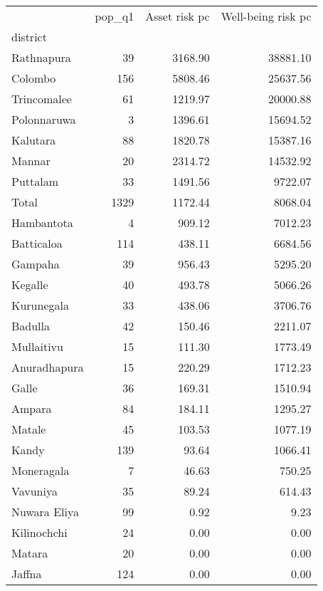 \begin{tabular}{lrrr}
\toprule
{} &  pop\_q1 &  Asset risk pc &  Well-being risk pc \\
district     &         &                &                     \\
\midrule
Rathnapura   &      39 &        3168.90 &            38881.10 \\
Colombo      &     156 &        5808.46 &            25637.56 \\
Trincomalee  &      61 &        1219.97 &            20000.88 \\
Polonnaruwa  &       3 &        1396.61 &            15694.52 \\
Kalutara     &      88 &        1820.78 &            15387.16 \\
Mannar       &      20 &        2314.72 &            14532.92 \\
Puttalam     &      33 &        1491.56 &             9722.07 \\
Total        &    1329 &        1172.44 &             8068.04 \\
Hambantota   &       4 &         909.12 &             7012.23 \\
Batticaloa   &     114 &         438.11 &             6684.56 \\
Gampaha      &      39 &         956.43 &             5295.20 \\
Kegalle      &      40 &         493.78 &             5066.26 \\
Kurunegala   &      33 &         438.06 &             3706.76 \\
Badulla      &      42 &         150.46 &             2211.07 \\
Mullaitivu   &      15 &         111.30 &             1773.49 \\
Anuradhapura &      15 &         220.29 &             1712.23 \\
Galle        &      36 &         169.31 &             1510.94 \\
Ampara       &      84 &         184.11 &             1295.27 \\
Matale       &      45 &         103.53 &             1077.19 \\
Kandy        &     139 &          93.64 &             1066.41 \\
Moneragala   &       7 &          46.63 &              750.25 \\
Vavuniya     &      35 &          89.24 &              614.43 \\
Nuwara Eliya &      99 &           0.92 &                9.23 \\
Kilinochchi  &      24 &           0.00 &                0.00 \\
Matara       &      20 &           0.00 &                0.00 \\
Jaffna       &     124 &           0.00 &                0.00 \\
\bottomrule
\end{tabular}
